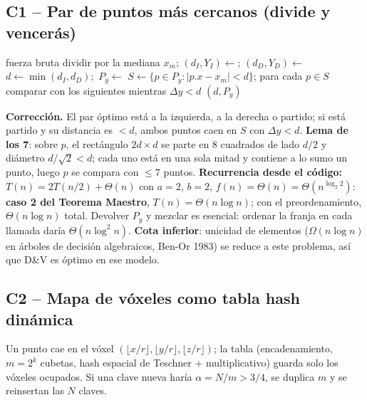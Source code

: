 \documentclass[11pt,letterpaper]{article}
\theoremstyle{plain}
\theoremstyle{definition}
\newcommand{\Th}{\Theta}
\newcommand{\Om}{\Omega}
\begin{document}
\subsection{C1 -- Par de puntos más cercanos (divide y vencerás)}

\begin{algorithm}[H]
\caption{\textsc{Rec}$(P_x)$ \small(precondición: $P_x$ ordenado por $x$ una sola vez con merge sort)}
\small
\begin{algorithmic}[1]
 \Return fuerza bruta \Comment{$\Th(1)$} \EndIf
\State dividir por la mediana $x_m$; $(d_I,Y_I)\gets$; $(d_D,Y_D)\gets$ 
\State $d\gets\min(d_I,d_D)$;\ $P_y\gets$ \Comment{$\Th(n)$}
\State $S\gets\{p\in P_y:|p.x-x_m|<d\}$; para cada $p\in S$ comparar con los siguientes mientras $\Delta y<d$ 
\State \Return $(d, P_y)$
\end{algorithmic}
\end{algorithm}

\textbf{Corrección.} El par óptimo está a la izquierda, a la derecha o partido; si está partido y su
distancia es $<d$, ambos puntos caen en $S$ con $\Delta y<d$. \textbf{Lema de los 7}: sobre $p$, el
rectángulo $2d\times d$ se parte en 8 cuadrados de lado $d/2$ y diámetro $d/\sqrt2<d$; cada uno está en
una sola mitad y contiene a lo sumo un punto, luego $p$ se compara con $\le7$ puntos.
\textbf{Recurrencia desde el código:} $T(n)=2T(n/2)+\Th(n)$ con $a=2$, $b=2$, $f(n)=\Th(n)=\Th(n^{\log_2 2})$:
\textbf{caso 2 del Teorema Maestro}, $T(n)=\Th(n\log n)$; con el preordenamiento, $\Th(n\log n)$ total.
Devolver $P_y$ y mezclar es esencial: ordenar la franja en cada llamada daría $\Th(n\log^2 n)$.
\textbf{Cota inferior}: unicidad de elementos ($\Om(n\log n)$ en árboles de decisión algebraicos,
Ben-Or 1983) se reduce a este problema, así que D\&V es óptimo en ese modelo.

\subsection{C2 -- Mapa de vóxeles como tabla hash dinámica}

Un punto cae en el vóxel $(\lfloor x/r\rfloor,\lfloor y/r\rfloor,\lfloor z/r\rfloor)$; la tabla (encadenamiento,
$m=2^k$ cubetas, hash espacial de Teschner + multiplicativo) guarda solo los vóxeles ocupados.
Si una clave nueva haría $\alpha=N/m>3/4$, se duplica $m$ y se reinsertan las $N$ claves.
\end{document}
